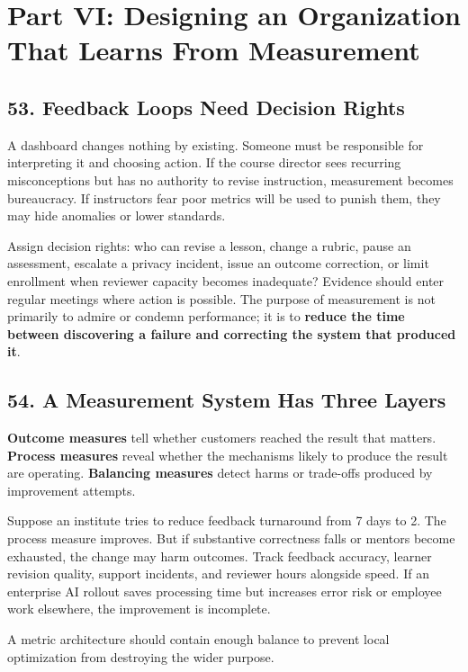 \section*{Part VI: Designing an Organization That Learns From Measurement}

\subsection*{53. Feedback Loops Need Decision Rights}

A dashboard changes nothing by existing. Someone must be responsible for interpreting it and choosing action. If the course director sees recurring misconceptions but has no authority to revise instruction, measurement becomes bureaucracy. If instructors fear poor metrics will be used to punish them, they may hide anomalies or lower standards.

Assign decision rights: who can revise a lesson, change a rubric, pause an assessment, escalate a privacy incident, issue an outcome correction, or limit enrollment when reviewer capacity becomes inadequate? Evidence should enter regular meetings where action is possible. The purpose of measurement is not primarily to admire or condemn performance; it is to \textbf{reduce the time between discovering a failure and correcting the system that produced it}.

\subsection*{54. A Measurement System Has Three Layers}

\textbf{Outcome measures} tell whether customers reached the result that matters. \textbf{Process measures} reveal whether the mechanisms likely to produce the result are operating. \textbf{Balancing measures} detect harms or trade-offs produced by improvement attempts.

Suppose an institute tries to reduce feedback turnaround from 7 days to 2. The process measure improves. But if substantive correctness falls or mentors become exhausted, the change may harm outcomes. Track feedback accuracy, learner revision quality, support incidents, and reviewer hours alongside speed. If an enterprise AI rollout saves processing time but increases error risk or employee work elsewhere, the improvement is incomplete.

A metric architecture should contain enough balance to prevent local optimization from destroying the wider purpose.

